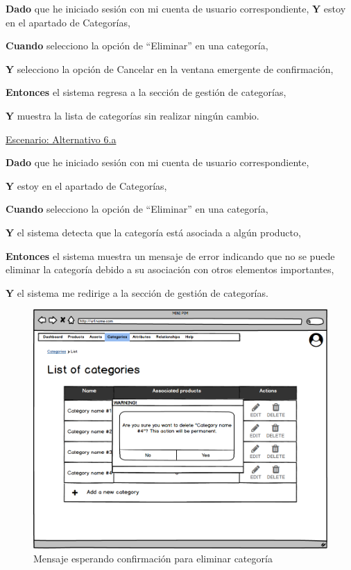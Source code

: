 \textbf{Dado} que he iniciado sesión con mi cuenta de usuario correspondiente,
\textbf{Y} estoy en el apartado de Categorías,\par
\textbf{Cuando} selecciono la opción de \enquote{Eliminar} en una categoría,\par
\textbf{Y} selecciono la opción de Cancelar en la ventana emergente de confirmación,\par
\textbf{Entonces} el sistema regresa a la sección de gestión de categorías,\par
\textbf{Y} muestra la lista de categorías sin realizar ningún cambio.\par


\vspace{0.20cm}

\underline{Escenario: Alternativo 6.a}\par
\vspace{0.15cm}

\textbf{Dado} que he iniciado sesión con mi cuenta de usuario correspondiente,\par
\textbf{Y} estoy en el apartado de Categorías,\par
\textbf{Cuando} selecciono la opción de \enquote{Eliminar} en una categoría,\par
\textbf{Y} el sistema detecta que la categoría está asociada a algún producto,\par
\textbf{Entonces} el sistema muestra un mensaje de error indicando que no se puede eliminar la categoría debido a su asociación con otros elementos importantes,\par
\textbf{Y} el sistema me redirige a la sección de gestión de categorías.\par


\vspace{0.20cm}

\begin{figure}[H]
    \includegraphics[width=1\linewidth]{mockups/RF4.4_1.png}
    \caption{Mensaje esperando confirmación para eliminar categoría}
   \end{figure}
\vspace{1.0cm}

